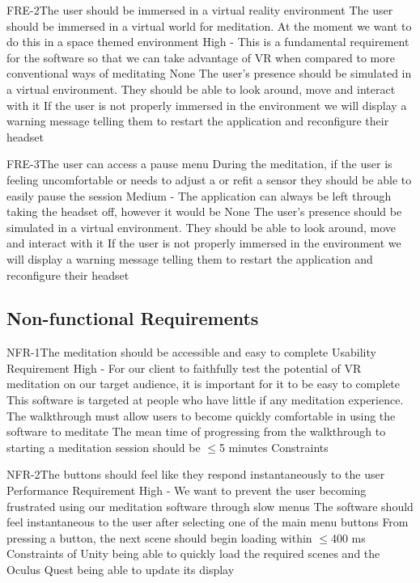 \documentclass[coverpage,lineno]{../custom}
\begin{document}
\FunctionalReq
{FRE-2}{The user should be immersed in a virtual reality environment}
{The user should be immersed in a virtual world for meditation. At the moment we want to do this in a space themed environment}
{High - \musthave}
{This is a fundamental requirement for the software so that we can take advantage of VR when compared to more conventional ways of meditating}
{None}
{The user's presence should be simulated in a virtual environment. They should be able to look around, move and interact with it}
{If the user is not properly immersed in the environment we will display a warning message telling them to restart the application and reconfigure their headset}

\FunctionalReq
{FRE-3}{The user can access a pause menu}
{During the meditation, if the user is feeling uncomfortable or needs to adjust a or refit a sensor they should be able to easily pause the session}
{Medium - \shouldhave}
{The application can always be left through taking the headset off, however it would be}
{None}
{The user's presence should be simulated in a virtual environment. They should be able to look around, move and interact with it}
{If the user is not properly immersed in the environment we will display a warning message telling them to restart the application and reconfigure their headset}

\subsection{Non-functional Requirements}
\label{ssec:nf_req}


\NonFunctionalReqSec
{NFR-1}{The meditation should be accessible and easy to complete}
{Usability Requirement}
{High - For our client to faithfully test the potential of VR meditation on our target audience, it is important for it to be easy to complete}
{This software is targeted at people who have little if any meditation experience. The walkthrough must allow users to become quickly comfortable in using the software to meditate}
{The mean time of progressing from the walkthrough to starting a meditation session should be $\le$5 minutes}
{Constraints}

\NonFunctionalReqSec
{NFR-2}{The buttons should feel like they respond instantaneously to the user}
{Performance Requirement}
{High - We want to prevent the user becoming frustrated using our meditation software through slow menus}
{The software should feel instantaneous to the user after selecting one of the main menu buttons}
{From pressing a button, the next scene should begin loading within $\le$400 ms}
{Constraints of Unity being able to quickly load the required scenes and the Oculus Quest being able to update its display}
\end{document}
